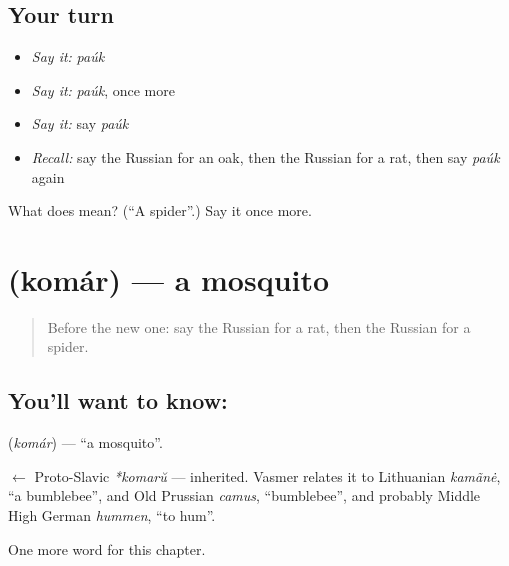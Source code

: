 \subsection*{Your turn}
\begin{itemize}
\raggedright
  \item \emph{Say it:} \emph{paúk}
  \item \emph{Say it:} \emph{paúk}, once more
  \item \emph{Say it:} say \emph{paúk}
  \item \emph{Recall:} say the Russian for an oak, then the Russian for a rat, then say \emph{paúk} again
\end{itemize}

\begin{tcolorbox}[breakable,colback=teal!4,colframe=teal!35!black,title={Before you move on}]
What does  mean? (\textquotedblleft{}A spider\textquotedblright{}.) Say it once more.
\end{tcolorbox}
\section[\texorpdfstring{\ru{комар} (komár)}{комар (komár)}]{ (komár) — a mosquito}

\label{lesson:RU-C196-komar}



\begin{quote}
Before the new one: say the Russian for a rat, then the Russian for a spider.
\end{quote}

\subsection*{You'll want to know: }
\textbf{} (\emph{komár}) — \textquotedblleft{}a mosquito\textquotedblright{}.

\begin{cousinweb}
\textbf{} $\leftarrow$ Proto-Slavic \emph{*komarŭ} — inherited. Vasmer relates it to Lithuanian \emph{kamãnė}, \textquotedblleft{}a bumblebee\textquotedblright{}, and Old Prussian \emph{camus}, \textquotedblleft{}bumblebee\textquotedblright{}, and probably Middle High German \emph{hummen}, \textquotedblleft{}to hum\textquotedblright{}.
\end{cousinweb}

\begin{grammarlens}[title={What you've built}]
One more word for this chapter.
\end{grammarlens}

